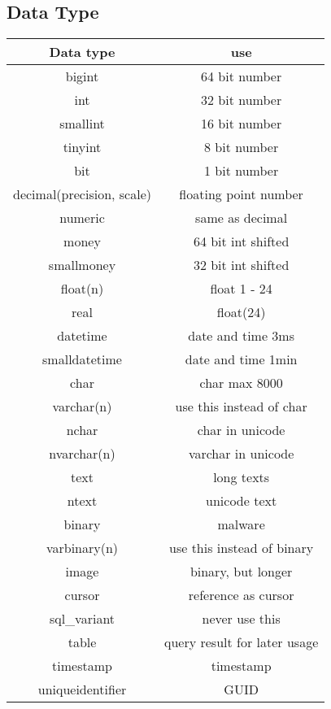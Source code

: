\documentclass[a4paper,8pt]{article} %
\begin{document}
\begin{small}
\begin{minipage}{0.5\linewidth}
			\section{Data Type}
			\begin{tabular}{c|c}
				Data type	& use\\\hline\hline
				bigint		& 64 bit number\\\hline
				int			& 32 bit number\\\hline
				smallint	& 16 bit number\\\hline
				tinyint		& 8 bit number\\\hline
				bit			& 1 bit number\\\hline
				decimal(precision, scale) & floating point number\\\hline
				numeric		& same as decimal\\\hline
				money		& 64 bit int shifted\\\hline
				smallmoney	& 32 bit int shifted\\\hline
				float(n)	& float 1 - 24\\\hline
				real		& float(24)\\\hline
				datetime	& date and time 3ms\\\hline
				smalldatetime	& date and time 1min\\\hline
				char		& char max 8000\\\hline
				varchar(n)	& use this instead of char\\\hline
				nchar		& char in unicode\\\hline
				nvarchar(n)	& varchar in unicode\\\hline
				text		& long texts\\\hline
				ntext		& unicode text\\\hline
				binary		& malware\\\hline
				varbinary(n)	& use this instead of binary\\\hline
				image		& binary, but longer\\\hline
				cursor		& reference as cursor\\\hline
				sql\_variant	& never use this\\\hline
				table		& query result for later usage\\\hline
				timestamp	& timestamp\\\hline
				uniqueidentifier & GUID\\\hline
			\end{tabular}
		\end{minipage}
		\begin{minipage}{0.5\linewidth}

\end{minipage}
\end{small}
\end{document}
